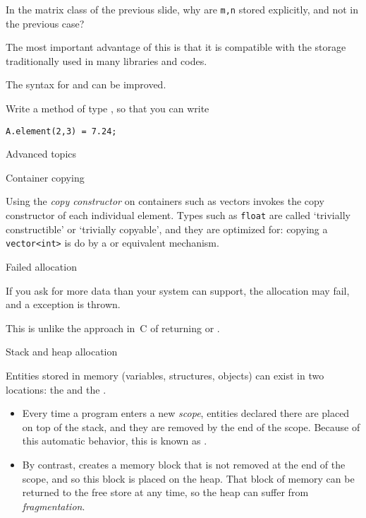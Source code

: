 \begin{exercise}
  \label{ex:matrixclass-rowcol2}
  In the matrix class of the previous slide,
  why are \lstinline{m,n} stored explicitly, and not in the
  previous case?
\end{exercise}

The most important advantage of this is that it is compatible with
the storage traditionally used in 
many libraries and codes.

The syntax for  and  can be improved.
\begin{exercise}
  Write a method  of type , so that you can write
\begin{lstlisting}
A.element(2,3) = 7.24;
\end{lstlisting}
\end{exercise}

 {Advanced topics}

 {Container copying}

Using the
\emph{copy constructor}
on containers such as vectors invokes the copy constructor
of each individual element.
Types such as \lstinline{float} are called
`trivially constructible' or `trivially copyable',
and they are optimized for:
copying a \lstinline{vector<int>} is
do by a  or equivalent mechanism.

 {Failed allocation}

If you ask for more data than your system can support,
the allocation may fail, and a 
exception is thrown.

This is unlike the approach in~C of returning
 or .

 {Stack and heap allocation}
\label{sec:stack-heap}

Entities stored in memory (variables, structures, objects) can exist
in two locations: the  and the
.
\begin{itemize}
\item Every time a program enters a new
  \emph{scope}, entities declared there are
  placed on top of the stack, and they are removed by the end of the
  scope. Because of this automatic behavior,
  this is known as .
\item By contrast, 
  creates a memory block that is not removed at the end of the scope,
  and so this block is placed on the heap.
  That block of memory can be returned to the free store at any
  time, so the heap can suffer from
  \emph{fragmentation}.
\end{itemize}

